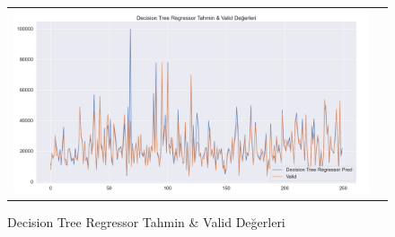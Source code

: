 \documentclass[conference]{IEEEtran}
\begin{document}
\begin{figure}[!h]
	\centering
	\begin{center}
		\begin{tabular}{cc}
			\includegraphics[scale=0.2]{pictures/pic_17.png}&
		\end{tabular}
	\end{center}
	\caption{Decision Tree Regressor Tahmin \& Valid Değerleri}
	\label{fig:17}
\end{figure}
\end{document}
